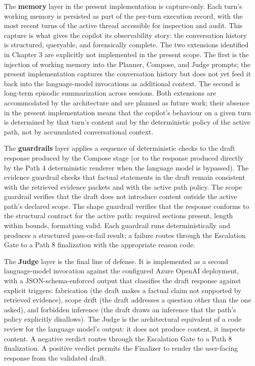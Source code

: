 The \textbf{memory} layer in the present implementation is capture-only. Each turn's working memory is persisted as part of the per-turn execution record, with the most recent turns of the active thread accessible for inspection and audit. This capture is what gives the copilot its observability story: the conversation history is structured, queryable, and forensically complete. The two extensions identified in Chapter 3 are explicitly not implemented in the present scope. The first is the injection of working memory into the Planner, Compose, and Judge prompts; the present implementation captures the conversation history but does not yet feed it back into the language-model invocations as additional context. The second is long-term episodic summarization across sessions. Both extensions are accommodated by the architecture and are planned as future work; their absence in the present implementation means that the copilot's behaviour on a given turn is determined by that turn's content and by the deterministic policy of the active path, not by accumulated conversational context.

The \textbf{guardrails} layer applies a sequence of deterministic checks to the draft response produced by the Compose stage (or to the response produced directly by the Path 4 deterministic renderer when the language model is bypassed). The evidence guardrail checks that factual statements in the draft remain consistent with the retrieved evidence packets and with the active path policy. The scope guardrail verifies that the draft does not introduce content outside the active path's declared scope. The shape guardrail verifies that the response conforms to the structural contract for the active path: required sections present, length within bounds, formatting valid. Each guardrail runs deterministically and produces a structured pass-or-fail result; a failure routes through the Escalation Gate to a Path 8 finalization with the appropriate reason code.

The \textbf{Judge} layer is the final line of defense. It is implemented as a second language-model invocation against the configured Azure OpenAI deployment, with a JSON-schema-enforced output that classifies the draft response against explicit triggers: fabrication (the draft makes a factual claim not supported by retrieved evidence), scope drift (the draft addresses a question other than the one asked), and forbidden inference (the draft draws an inference that the path's policy explicitly disallows). The Judge is the architectural equivalent of a code review for the language model's output: it does not produce content, it inspects content. A negative verdict routes through the Escalation Gate to a Path 8 finalization. A positive verdict permits the Finalizer to render the user-facing response from the validated draft.

